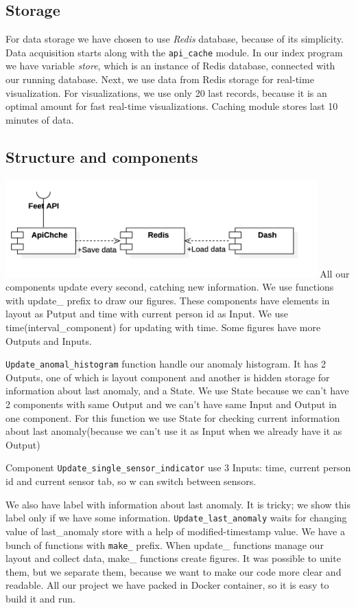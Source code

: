 \documentclass{article}
\begin{document}
\subsection{Storage}
For data storage we have chosen to use \textit{Redis} database, because of its simplicity. Data acquisition starts along with the \texttt{api\_cache} module. In our index program we have variable \textit{store}, which is an instance of Redis database, connected with our running database. Next, we use data from Redis storage for real-time visualization. For visualizations, we use only 20 last records, because it is an optimal amount for fast real-time visualizations. Caching module stores last 10 minutes of data.
\subsection{Structure and components}
\includegraphics[width=12cm]{MagicFeetComponents}
\newline
All our components update every second, catching new information. We use functions with update\_ prefix to draw our figures. These components have elements in layout as Putput and time with
current person id as Input. We use time(interval\_component) for updating with time. Some figures have more Outputs and Inputs.

\texttt{Update\_anomal\_histogram} function handle our anomaly histogram. It has 2 Outputs, one of which is layout component and another is hidden storage for information about last anomaly, and a State. We use State because we can't have 2 components with same Output and we can't have same Input and Output in one component. For this function we use State for checking current information about last anomaly(because we can't use it as Input when we already have it as Output)

Component \texttt{Update\_single\_sensor\_indicator} use 3 Inputs: time, current person id and current sensor tab, so w can switch between sensors.

We also have label with information about last anomaly. It is tricky; we show this label only if we have some information. \texttt{Update\_last\_anomaly} waits for changing value of last\_anomaly store with a help of modified-timestamp value.
\newline
We have a bunch of functions with \texttt{make\_} prefix. When update\_ functions manage our layout and collect data, make\_ functions create figures. It was possible to unite them, but we separate them, because we want to make our code more clear and readable.
\newline
All our project we have packed in Docker container, so it is easy to build it and run.
\end{document}
